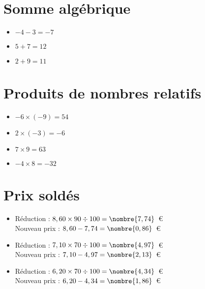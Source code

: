\documentclass[a4paper,11pt,fleqn]{article}
\begin{document}
\section{Somme algébrique}
\begin{itemize}

  \item $-4 -3=-7$
  \item $5 +7=12$
  \item $2 +9=11$
\end{itemize}

\section{Produits de nombres relatifs}
\begin{itemize}

  \item $-6\times(-9)=54$
  \item $2\times(-3)=-6$
  \item $7\times9=63$
  \item $-4\times8=-32$
\end{itemize}

\section{Prix soldés}
\begin{itemize}

  \item Réduction : $8,60\times90\div100=\nombre{7,74}$~€\\
  Nouveau prix : $8,60-7,74=\nombre{0,86}$~€
  \item Réduction : $7,10\times70\div100=\nombre{4,97}$~€\\
  Nouveau prix : $7,10-4,97=\nombre{2,13}$~€
  \item Réduction : $6,20\times70\div100=\nombre{4,34}$~€\\
  Nouveau prix : $6,20-4,34=\nombre{1,86}$~€
\end{itemize}
\end{document}

